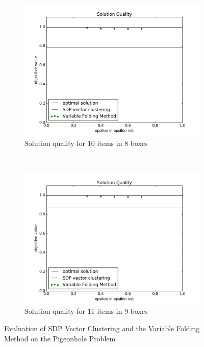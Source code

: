 \documentclass[12pt]{article} %
\begin{document}
\begin{figure}[ht!]
	\begin{subfigure}[b]{0.45\textwidth}
	\centering
	\includegraphics[width=\textwidth]{solution_epsilon_n10m8}
	\caption{Solution quality for 10 items in 8 boxes}
	\label{n10m8}
	\end{subfigure}
	~
	\begin{subfigure}[b]{0.45\textwidth}
	\centering
	\includegraphics[width=\textwidth]{solution_epsilon_n11m9}
	\caption{Solution quality for 11 items in 9 boxes}
	\label{n11m9}
	\end{subfigure}
\caption{Evaluation of SDP Vector Clustering and the Variable Folding Method on the Pigeonhole Problem}
\label{pigeon}
\end{figure}
\end{document}
